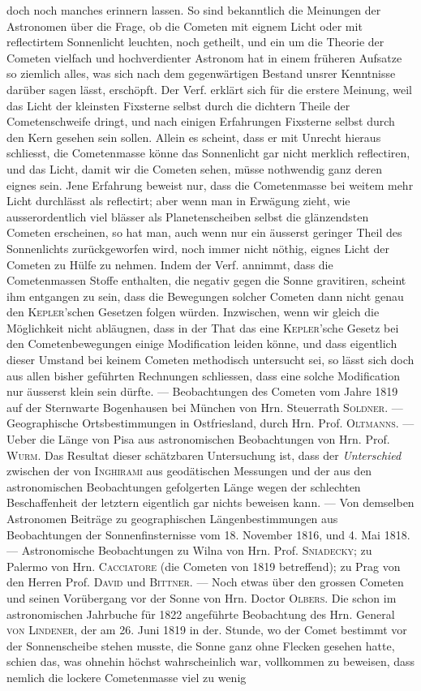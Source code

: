 \noindent doch noch manches erinnern lassen. So sind bekanntlich die Meinungen der Astronomen über die Frage, ob die Cometen mit eignem Licht oder mit reflectirtem Sonnenlicht leuchten, noch getheilt, und ein um die Theorie der Cometen vielfach und hochverdienter Astronom hat in einem früheren Aufsatze so ziemlich alles, was sich nach dem gegenwärtigen Bestand unsrer Kenntnisse darüber sagen lässt, erschöpft. Der Verf. erklärt sich für die erstere Meinung, weil das Licht der kleinsten Fixsterne selbst durch die dichtern Theile der Cometenschweife dringt, und nach einigen Erfahrungen Fixsterne selbst durch den Kern gesehen sein sollen. Allein es scheint, dass er mit Unrecht hieraus schliesst, die Cometenmasse könne das Sonnenlicht gar nicht merklich reflectiren, und das Licht, damit wir die Cometen sehen, müsse nothwendig ganz deren eignes sein. Jene Erfahrung beweist nur, dass die Cometenmasse bei weitem mehr Licht durchlässt als reflectirt; aber wenn man in Erwägung zieht, wie ausserordentlich viel blässer als Planetenscheiben selbst die glänzendsten Cometen erscheinen, so hat man, auch wenn nur ein äusserst geringer Theil des Sonnenlichts zurückgeworfen wird, noch immer nicht nöthig, eignes Licht der Cometen zu Hülfe zu nehmen. Indem der Verf. annimmt, dass die Cometenmassen Stoffe enthalten, die negativ gegen die Sonne gravitiren, scheint ihm entgangen zu sein, dass die Bewegungen solcher Cometen dann nicht genau den \textsc{Kepler}'schen Gesetzen folgen würden. Inzwischen, wenn wir gleich die Möglichkeit nicht abläugnen, dass in der That das eine \textsc{Kepler}'sche Gesetz bei den Cometenbewegungen einige Modification leiden könne, und dass eigentlich dieser Umstand bei keinem Cometen methodisch untersucht sei, so lässt sich doch aus allen bisher geführten Rechnungen schliessen, dass eine solche Modification nur äusserst klein sein dürfte. --- Beobachtungen des Cometen vom Jahre 1819 auf der Sternwarte Bogenhausen bei München von Hrn. Steuerrath \textsc{Soldner}. --- Geographische Ortsbestimmungen in Ostfriesland, durch Hrn. Prof. \textsc{Oltmanns}. --- Ueber die Länge von Pisa aus astronomischen Beobachtungen von Hrn. Prof. \textsc{Wurm}. Das Resultat dieser schätzbaren Untersuchung ist, dass der \emph{Unterschied} zwischen der von \textsc{Inghirami} aus geodätischen Messungen und der aus den astronomischen Beobachtungen gefolgerten Länge wegen der schlechten Beschaffenheit der letztern eigentlich gar nichts beweisen kann. --- Von demselben Astronomen Beiträge zu geographischen Längenbestimmungen aus Beobachtungen der Sonnenfinsternisse vom 18. November 1816, und 4. Mai 1818. --- Astronomische Beobachtungen zu Wilna von Hrn. Prof. \textsc{Sniadecky}; zu Palermo von Hrn. \textsc{Cacciatore} (die Cometen von 1819 betreffend); zu Prag von den Herren Prof. \textsc{David} und \textsc{Bittner}. --- Noch etwas über den grossen Cometen und seinen Vorübergang vor der Sonne von Hrn. Doctor \textsc{Olbers}. Die schon im astronomischen Jahrbuche für 1822 angeführte Beobachtung des Hrn. General \textsc{von Lindener}, der am 26. Juni 1819 in der. Stunde, wo der Comet bestimmt vor der Sonnenscheibe stehen musste, die Sonne ganz ohne Flecken gesehen hatte, schien das, was ohnehin höchst wahrscheinlich war, vollkommen zu beweisen, dass nemlich die lockere Cometenmasse viel zu wenig 